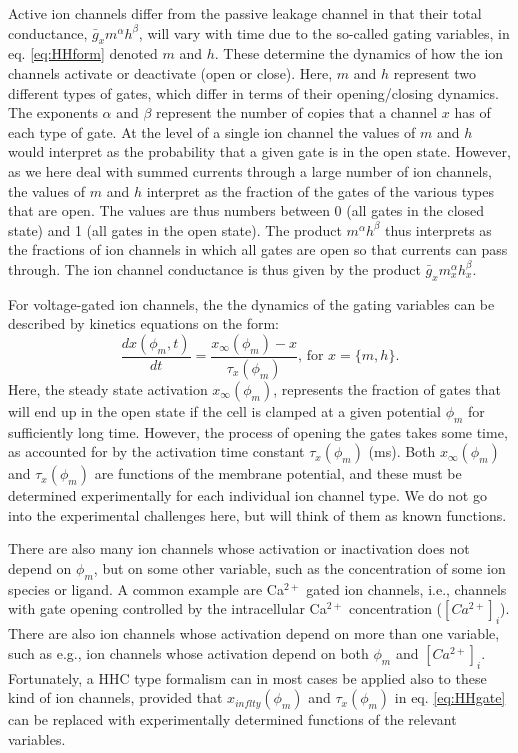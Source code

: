 Active ion channels differ from the passive leakage channel in that their total conductance, $\bar{g}_{x} m^{\alpha} h^{\beta}$, will vary with time due to the so-called gating variables, in eq. \ref{eq:HHform} denoted $m$ and $h$. These determine the dynamics of how the ion channels activate or deactivate (open or close). Here, $m$ and $h$ represent two different types of gates, which differ in terms of their opening/closing dynamics. The exponents $\alpha$ and $\beta$ represent the number of copies that a channel $x$ has of each type of gate. At the level of a single ion channel the values of $m$ and $h$ would interpret as the probability that a given gate is in the open state. However, as we here deal with summed currents through a large number of ion channels, the values of $m$ and $h$ interpret as the fraction of the gates of the various types that are open. The values are thus numbers between 0 (all gates in the closed state) and 1 (all gates in the open state). The product $m^{\alpha} h^{\beta}$ thus interprets as the fractions of ion channels in which all gates are open so that currents can pass through. The ion channel conductance is thus given by the product $\bar{g}_x m_x^{\alpha} h_x^{\beta}$.

For voltage-gated ion channels, the the dynamics of the gating variables can be described by kinetics equations on the form:
\begin{equation}
\frac{dx(\phi_m,t)}{dt} = \frac{x_{\infty}(\phi_m) - x}{\tau_x(\phi_m)},  \, \text{for } x = \{m,h\}.
\label{eq:HHgate}
\end{equation}
Here, the steady state activation $x_{\infty}(\phi_m)$, represents the fraction of gates that will end up in the open state if the cell is clamped at a given potential $\phi_m$ for sufficiently long time. However, the process of opening the gates takes some time, as accounted for by the activation time constant $\tau_x(\phi_m)$ (ms). Both $x_{\infty}(\phi_m)$ and $\tau_x(\phi_m)$ are functions of the membrane potential, and these must be determined experimentally for each individual ion channel type. We do not go into the experimental challenges here, but will think of them as known functions. 

There are also many ion channels whose activation or inactivation does not depend on $\phi_m$, but on some other variable, such as the concentration of some ion species or ligand. A common example are Ca$^{2+}$ gated ion channels, i.e., channels with gate opening controlled by the intracellular Ca$^{2+}$ concentration ($[Ca^{2+}]_i$). There are also ion channels whose activation depend on more than one variable, such as e.g., ion channels whose activation depend on both $\phi_m$ and $[Ca^{2+}]_i$. Fortunately, a HHC type formalism can in most cases be applied also to these kind of ion channels, provided that $x_{inflty}(\phi_m)$ and $\tau_x(\phi_m)$ in eq. \ref{eq:HHgate} can be replaced with experimentally determined functions of the relevant variables. 


